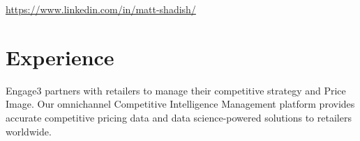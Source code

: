 \documentclass[]{deedy-resume-openfont}
\begin{document}
%
%

%
%



\href{https://www.linkedin.com/in/matt-shadish/}{https://www.linkedin.com/in/matt-shadish/}

\begin{comment}
\begin{center}
\huge\color{subheadings}\custombold{LIFELONG LEARNER}
\end{center}
\end{comment}

\section{Experience}


Engage3 partners with retailers to manage their competitive strategy and Price Image.  Our omnichannel Competitive Intelligence Management platform provides accurate competitive pricing data and data science-powered solutions to retailers worldwide.

\sectionsep
\end{document}

